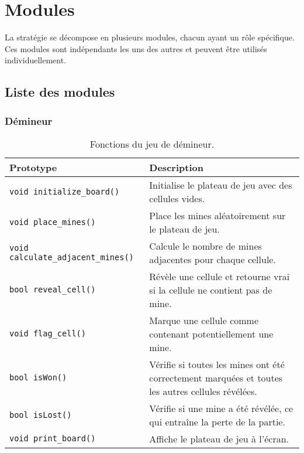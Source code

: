 \chapter{Modules}
\label{chap:modules}

La stratégie se décompose en plusieurs modules, chacun ayant un rôle spécifique.
Ces modules sont indépendants les uns des autres et peuvent être utilisés individuellement.

\section{Liste des modules}

\subsection{Démineur}
\begin{table}[!htpb]
    \label{tab:modules-minesweeper}
    \begin{tabularx}{\textwidth}{lX}
        \toprule
        \textbf{Prototype} & \textbf{Description} \\
        \midrule
        \texttt{void initialize\_board()} & Initialise le plateau de jeu avec des cellules vides. \\
        \texttt{void place\_mines()} & Place les mines aléatoirement sur le plateau de jeu. \\
        \texttt{void calculate\_adjacent\_mines()} & Calcule le nombre de mines adjacentes pour chaque cellule. \\
        \texttt{bool reveal\_cell()} & Révèle une cellule et retourne vrai si la cellule ne contient pas de mine. \\
        \texttt{void flag\_cell()} & Marque une cellule comme contenant potentiellement une mine. \\
        \texttt{bool isWon()} & Vérifie si toutes les mines ont été correctement marquées et toutes les autres cellules révélées. \\
        \texttt{bool isLost()} & Vérifie si une mine a été révélée, ce qui entraîne la perte de la partie. \\
        \texttt{void print\_board()} & Affiche le plateau de jeu à l'écran. \\
        \bottomrule
    \end{tabularx}
    \caption{Fonctions du jeu de démineur.}
\end{table}

